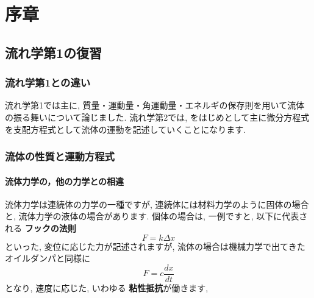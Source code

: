 \documentclass[uplatex,12pt]{jsbook}
\newcommand{\strong}[1]{{\textbf{\color{violet} #1}}}
\begin{document}
\tableofcontents
	\chapter{序章}
	\section{流れ学第1の復習}
	\subsection{流れ学第1との違い}
	流れ学第1では主に, 質量・運動量・角運動量・エネルギの保存則を用いて流体の振る舞いについて論じました. 流れ学第2では, \NS{}をはじめとして主に微分方程式を支配方程式として流体の運動を記述していくことになります.
	
	\subsection{流体の性質と運動方程式}
	\subsubsection{流体力学の，他の力学との相違}
	流体力学は連続体の力学の一種ですが, 連続体には材料力学のように固体の場合と, 流体力学の液体の場合があります. 個体の場合は, 一例ですと, 以下に代表される\strong{フックの法則}
	\begin{equation}
		F = k\Delta x
	\end{equation}
	といった, 変位に応じた力が記述されますが, 流体の場合は機械力学で出てきたオイルダンパと同様に
	\begin{equation}
		F = c \frac{dx}{dt}
	\end{equation}
	となり, 速度に応じた, いわゆる\strong{粘性抵抗}が働きます, 
	
\end{document}

